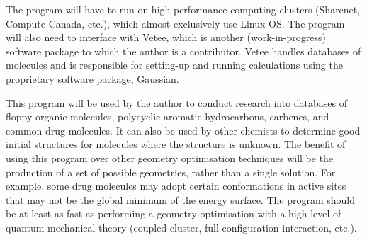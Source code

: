 \documentclass{article}
\begin{document}

\vspace{2mm} %

The program will have to run on high performance computing clusters (Sharcnet, Compute Canada, etc.), which almost exclusively use Linux OS. The program will also need to interface with Vetee, which is another (work-in-progress) software package to which the author is a contributor. Vetee handles databases of molecules and is responsible for setting-up and running calculations using the proprietary software package, Gaussian. 

\vspace{3mm} %


\vspace{2mm} %

This program will be used by the author to conduct research into databases of floppy organic molecules, polycyclic aromatic hydrocarbons, carbenes, and common drug molecules. It can also be used by other chemists to determine good initial structures for molecules where the structure is unknown. The benefit of using this program over other geometry optimisation techniques will be the production of a set of possible geometries, rather than a single solution. For example, some drug molecules may adopt certain conformations in active sites that may not be the global minimum of the energy surface. The program should be at least as fast as performing a geometry optimisation with a high level of quantum mechanical theory (coupled-cluster, full configuration interaction, etc.).




\end{document}
